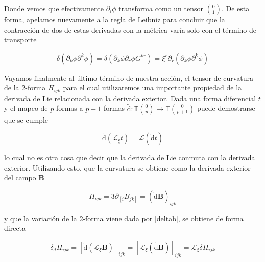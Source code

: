 \documentclass{article}
\numberwithin{equation}{section}
\begin{document}
Donde vemos que efectivamente $ \partial_i \phi $ transforma como un tensor $ \binom{0}{1} $. De esta forma, apelamos nuevamente a la regla de Leibniz para concluir que la contracción de dos de estas derivadas con la métrica varía solo con el término de transporte

\vspace{0.4cm}

\begin{boxquation}
	\begin{equation}\label{res4}
	\delta \left(\partial_k\phi\partial^k\phi\right) = \delta \left(\partial_k\phi\partial_r 	\phi G^{k r}\right) = \xi^r \partial_r \left(\partial_k \phi\partial^k \phi\right)
	\end{equation}
\end{boxquation}

\vspace{0.4cm}

Vayamos finalmente al último término de nuestra acción, el tensor de curvatura de la 2-forma $ H_{ijk} $ para el cual utilizaremos una importante propiedad de la derivada de Lie relacionada con la derivada exterior. Dada una forma diferencial $ t $ y el mapeo de $p$ formas a $ p+1 $ formas $ \tilde{\mathrm{d}}:\mathbb{T} \binom{0}{p} \rightarrow \mathbb{T} \binom{0}{p+1} $ puede demostrarse que se cumple

\begin{equation*}
\tilde{\mathrm{d}} \left( \mathcal{L}_{\xi} t \right) = \mathcal{L} \left( \tilde{\mathrm{d}} t\right)
\end{equation*}

lo cual no es otra cosa que decir que la derivada de Lie conmuta con la derivada exterior. Utilizando esto, que la curvatura se obtiene como la derivada exterior del campo $ \textbf{B} $

\begin{equation*}
H_{ijk} = 3 \partial_{\left[ i \right.} B_{\left. j k \right] } = \left(\tilde{\mathrm{d}}\textbf{B}\right)_{i j k}
\end{equation*}

y que la variación de la 2-forma viene dada por \ref{deltab}, se obtiene de forma directa 

\begin{equation*}
\delta_d H_{ijk} = \left[\tilde{\mathrm{d}} \left( \mathcal{L}_{\xi} \textbf{B} \right)\right]_{i j k} = \left[ \mathcal{L}_{\xi} \left(  \tilde{\mathrm{d}} \textbf{B} \right)\right]_{i j k} = \mathcal{L}_{\xi} \delta H_{ijk}
\end{equation*}
\end{document}
